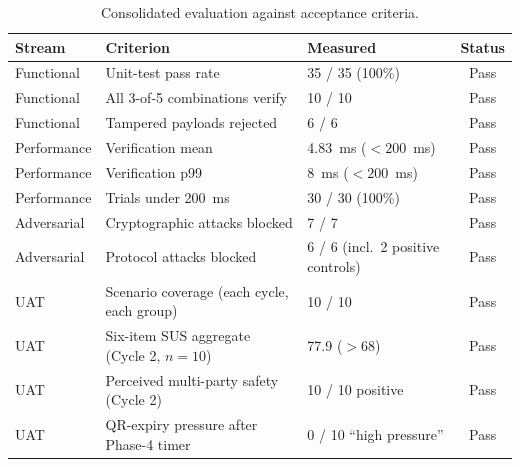 \begin{table}[H]
  \centering
  \caption{Consolidated evaluation against acceptance criteria.}
  \label{tab:results-summary}
  \begin{tabular}{|l|l|l|c|}
    \hline
    Stream & Criterion & Measured & Status \\\hline
    Functional & Unit-test pass rate & 35 / 35 (100\%) & Pass \\\hline
    Functional & All 3-of-5 combinations verify & 10 / 10 & Pass \\\hline
    Functional & Tampered payloads rejected & 6 / 6 & Pass \\\hline
    Performance & Verification mean & 4.83~ms ($< 200$~ms) & Pass \\\hline
    Performance & Verification p99 & 8~ms ($< 200$~ms) & Pass \\\hline
    Performance & Trials under 200~ms & 30 / 30 (100\%) & Pass \\\hline
    Adversarial & Cryptographic attacks blocked & 7 / 7 & Pass \\\hline
    Adversarial & Protocol attacks blocked & 6 / 6 (incl.\ 2 positive controls) & Pass \\\hline
    UAT & Scenario coverage (each cycle, each group) & 10 / 10 & Pass \\\hline
    UAT & Six-item SUS aggregate (Cycle 2, $n = 10$) & 77.9 ($> 68$) & Pass \\\hline
    UAT & Perceived multi-party safety (Cycle 2) & 10 / 10 positive & Pass \\\hline
    UAT & QR-expiry pressure after Phase-4 timer & 0 / 10 ``high pressure'' & Pass \\\hline
  \end{tabular}
\end{table}
